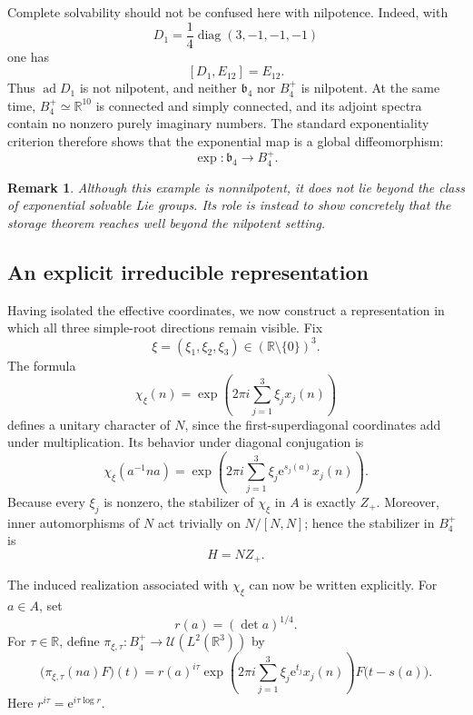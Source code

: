 \documentclass[10pt,a4paper]{amsart}
\numberwithin{equation}{section}
\newtheorem{remark}[theorem]{Remark}
\newcommand{\R}{\mathbb R}
\newcommand{\U}{\mathcal U}
\newcommand{\ad}{\operatorname{ad}}
\newcommand{\e}{\mathrm e}
\begin{document}
Complete solvability should not be confused here with nilpotence.  Indeed,
with
\[
 D_1=\frac14\operatorname{diag}(3,-1,-1,-1)
\]
one has
\[
 [D_1,E_{12}]=E_{12}.
\]
Thus $\ad D_1$ is not nilpotent, and neither $\mathfrak b_4$ nor
$B_4^+$ is nilpotent.  At the same time, $B_4^+\simeq\R^{10}$ is connected
and simply connected, and its adjoint spectra contain no nonzero purely
imaginary numbers.  The standard exponentiality criterion therefore shows
that the exponential map is a global diffeomorphism:
\[
 \exp:\mathfrak b_4\longrightarrow B_4^+.
\]

\begin{remark}
Although this example is nonnilpotent, it does not lie beyond the class of
exponential solvable Lie groups.  Its role is instead to show concretely that
the storage theorem reaches well beyond the nilpotent setting.
\end{remark}

\subsection{An explicit irreducible representation}

Having isolated the effective coordinates, we now construct a representation
in which all three simple-root directions remain visible.  Fix
\[
 \xi=(\xi_1,\xi_2,\xi_3)\in(\R\setminus\{0\})^3.
\]
The formula
\begin{equation}
 \chi_\xi(n)
 =\exp\left(2\pi i\sum_{j=1}^3\xi_jx_j(n)\right)
 \label{eq:B4-N-character}
\end{equation}
defines a unitary character of $N$, since the first-superdiagonal coordinates
add under multiplication.  Its behavior under diagonal conjugation is
\[
 \chi_\xi(a^{-1}na)
 =\exp\left(
 2\pi i\sum_{j=1}^3\xi_j\e^{s_j(a)}x_j(n)
 \right).
\]
Because every $\xi_j$ is nonzero, the stabilizer of $\chi_\xi$ in $A$ is
exactly $Z_+$.  Moreover, inner automorphisms of $N$ act trivially on
$N/[N,N]$; hence the stabilizer in $B_4^+$ is
\[
 H=NZ_+.
\]

The induced realization associated with $\chi_\xi$ can now be written
explicitly.
For $a\in A$, set
\[
 r(a)=(\det a)^{1/4}.
\]
For $\tau\in\R$, define
$\pi_{\xi,\tau}:B_4^+\to\U(L^2(\R^3))$ by
\begin{equation}
 \bigl(\pi_{\xi,\tau}(na)F\bigr)(t)
 =r(a)^{i\tau}
 \exp\left(
 2\pi i\sum_{j=1}^3\xi_j\e^{t_j}x_j(n)
 \right)
 F\bigl(t-s(a)\bigr).
 \label{eq:B4-explicit-representation}
\end{equation}
Here $r^{i\tau}=\e^{i\tau\log r}$.
\end{document}
